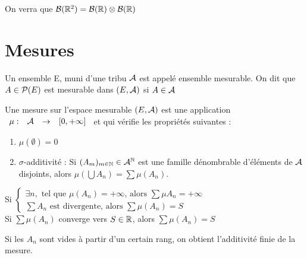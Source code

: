 \documentclass[]{report}
\begin{document}
\begin{ex}
    On verra que $\mathcal{B}(\mathbb{R}^2)=\mathcal{B}(\mathbb{R})\otimes\mathcal{B}(\mathbb{R})$
\end{ex}

\section{Mesures}

\begin{df}
    Un ensemble E, muni d'une tribu $\mathcal{A}$ est appelé ensemble mesurable. On dit que $A\in\mathcal{P}(E)$ est mesurable dans $(E,\mathcal{A})$ si $A\in \mathcal{A}$
\end{df}

\begin{df}
    Une mesure sur l'espace mesurable $(E,\mathcal{A})$ est une application $\begin{array}{ccccc} \mu : & \mathcal{A} & \to & [0,+\infty] \end{array}$ et qui vérifie les propriétés suivantes :\\
    \begin{enumerate}
        \item $\mu(\emptyset)=0$
        \item $\sigma$-additivité : Si $(A_m)_{m\in\mathbb{N}}\in \mathcal{A}^{\mathbb{N}}$ est une famille dénombrable d'éléments de $\mathcal{A}$ disjoints, alors $\mu(\bigcup A_n)=\sum\mu(A_n)$.
    \end{enumerate}
    Si $\left\{ \begin{array}{ll}
        \exists n,\text{ tel que }\mu(A_n)=+\infty\text{, alors }\sum\mu A_n=+\infty\\
        \sum A_n \text{ est divergente, alors }\sum\mu(A_n)=S
    \end{array}\right.$\\
    Si $\sum\mu(A_n)$ converge vers $S\in\mathbb{R}$, alors $\sum\mu (A_n)=S$
\end{df}

\begin{re}
    Si les $A_n$ sont vides à partir d'un certain rang, on obtient l'additivité finie de la mesure.
\end{re}
\end{document}
